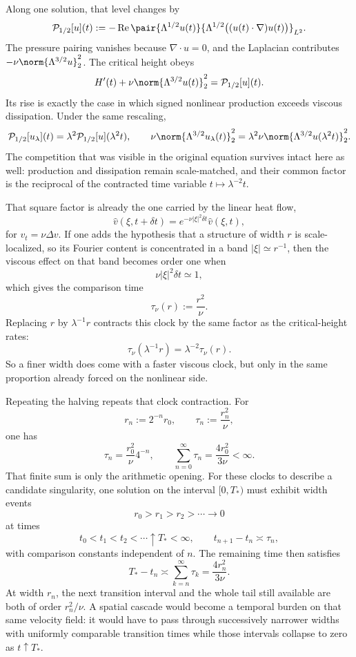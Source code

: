
Along one solution, that level changes by
\[
  \mathcal P_{1/2}[u](t)
  :=
  -\operatorname{Re}
  \pair
    {\Lambda^{1/2}u(t)}
    {\Lambda^{1/2}\bigl((u(t)\cdot\nabla)u(t)\bigr)}_{L^2}.
\]
The pressure pairing vanishes because \(\nabla\cdot u=0\), and the Laplacian contributes \(-\nu\norm{\Lambda^{3/2}u}_2^2\). The critical height obeys
\[
  H'(t)
  +
  \nu\norm{\Lambda^{3/2}u(t)}_2^2
  =
  \mathcal P_{1/2}[u](t).
\]
Its rise is exactly the case in which signed nonlinear production exceeds viscous dissipation. Under the same rescaling,
\[
  \mathcal P_{1/2}[u_\lambda](t)
  =
  \lambda^2\mathcal P_{1/2}[u](\lambda^2t),
  \qquad
  \nu\norm{\Lambda^{3/2}u_\lambda(t)}_2^2
  =
  \lambda^2\nu\norm{\Lambda^{3/2}u(\lambda^2t)}_2^2.
\]
The competition that was visible in the original equation survives intact here as well: production and dissipation remain scale-matched, and their common factor is the reciprocal of the contracted time variable \(t\mapsto\lambda^{-2}t\).


That square factor is already the one carried by the linear heat flow,
\[
  \widehat v(\xi,t+\delta t)
  =
  e^{-\nu|\xi|^2\delta t}\widehat v(\xi,t),
\]
for \(v_t=\nu\Delta v\). If one adds the hypothesis that a structure of width \(r\) is scale-localized, so its Fourier content is concentrated in a band \(|\xi|\simeq r^{-1}\), then the viscous effect on that band becomes order one when
\[
  \nu|\xi|^2\delta t\simeq1,
\]
which gives the comparison time
\[
  \tau_\nu(r)
  :=
  \frac{r^2}{\nu}.
\]
Replacing \(r\) by \(\lambda^{-1}r\) contracts this clock by the same factor as the critical-height rates:
\[
  \tau_\nu(\lambda^{-1}r)
  =
  \lambda^{-2}\tau_\nu(r).
\]
So a finer width does come with a faster viscous clock, but only in the same proportion already forced on the nonlinear side.


Repeating the halving repeats that clock contraction. For
\[
  r_n:=2^{-n}r_0,
  \qquad
  \tau_n:=\frac{r_n^2}{\nu},
\]
one has
\[
  \tau_n
  =
  \frac{r_0^2}{\nu}4^{-n},
  \qquad
  \sum_{n=0}^{\infty}\tau_n
  =
  \frac{4r_0^2}{3\nu}
  <
  \infty.
\]
That finite sum is only the arithmetic opening. For these clocks to describe a candidate singularity, one \NavierStokes{} solution on the interval \([0,T_*)\) must exhibit width events
\[
  r_0>r_1>r_2>\cdots\longrightarrow0
\]
at times
\[
  t_0<t_1<t_2<\cdots\uparrow T_*<\infty,
  \qquad
  t_{n+1}-t_n\asymp\tau_n,
\]
with comparison constants independent of \(n\). The remaining time then satisfies
\[
  T_*-t_n
  \asymp
  \sum_{k=n}^{\infty}\tau_k
  =
  \frac{4r_n^2}{3\nu}.
\]
At width \(r_n\), the next transition interval and the whole tail still available are both of order \(r_n^2/\nu\). A spatial cascade would become a temporal burden on that same velocity field: it would have to pass through successively narrower widths with uniformly comparable transition times while those intervals collapse to zero as \(t\uparrow T_*\).
